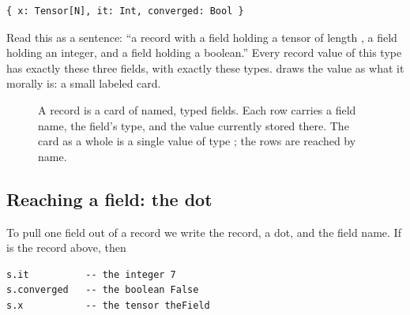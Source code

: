 \begin{lstlisting}[style=l4style]
{ x: Tensor[N], it: Int, converged: Bool }
\end{lstlisting}

Read this as a sentence: ``a record with a field  holding a tensor of
length , a field  holding an integer, and a field
 holding a boolean.'' Every record value of this type has
exactly these three fields, with exactly these types.  draws the
value as what it morally is: a small labeled card.

\begin{figure}[t]
\centering
{}
\caption[A record as a labeled card]{A record is a card of named, typed fields.
Each row carries a field name, the field's type, and the value currently stored
there. The card as a whole is a single value of type
; the rows
are reached by name.}
\label{fig:card}
\end{figure}

\subsection{Reaching a field: the dot}

To pull one field out of a record we write the record, a dot, and the field
name. If  is the record above, then

\begin{lstlisting}[style=l4style]
s.it          -- the integer 7
s.converged   -- the boolean False
s.x           -- the tensor theField
\end{lstlisting}

